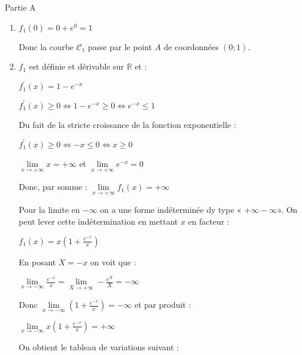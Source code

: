 \begin{corrige}
     \begin{h3}Partie A\end{h3}
     \begin{enumerate}
          \item
          $f_{1}\left(0\right)=0+e^{0}=1$
          \par
          Donc la courbe $\mathscr C_{1}$ passe par le point $A$ de coordonnées $\left(0 ; 1\right)$.
          \item
          $f_{1}$ est définie et dérivable sur $\mathbb{R}$ et :
          \par
          $f_{1}^{\prime}\left(x\right)=1-e^{-x}$
          \par
          $f_{1}^{\prime}\left(x\right) \geqslant  0  \Leftrightarrow   1-e^{-x} \geqslant 0  \Leftrightarrow  e^{-x}\leqslant 1$
          \par
          Du fait de la stricte croissance de la fonction exponentielle :
          \par
          $f_{1}^{\prime}\left(x\right) \geqslant  0  \Leftrightarrow   -x \leqslant  0   \Leftrightarrow  x\geqslant 0$
          \par
          $\lim\limits_{x\rightarrow +\infty }x= + \infty $ et $\lim\limits_{x\rightarrow +\infty }e^{-x}= 0$
          \par
          Donc, par somme : $\lim\limits_{x\rightarrow +\infty }f_{1}\left(x\right)= +\infty $
          \par
          Pour la limite en $-\infty $ on a une forme indéterminée dy type « $+\infty -\infty  $». On peut lever cette indétermination en mettant $x$ en facteur :
          \par
          $f_{1}\left(x\right)=x\left(1+\frac{e^{-x}}{x}\right)$
          \par
          En posant $X=-x$ on voit que :
          \par
          $\lim\limits_{x\rightarrow -\infty }\frac{e^{-x}}{x}= \lim\limits_{X\rightarrow +\infty }-\frac{e^{X}}{X} =-\infty $
          \par
          Donc $\lim\limits_{x\rightarrow -\infty }\left(1+\frac{e^{-x}}{x}\right)= -\infty $ et par produit :
          \par
          $\lim\limits_{x\rightarrow -\infty }x\left(1+\frac{e^{-x}}{x}\right)= +\infty $
          \par
          On obtient le tableau de variations suivant :

\end{enumerate}
\end{corrige}
